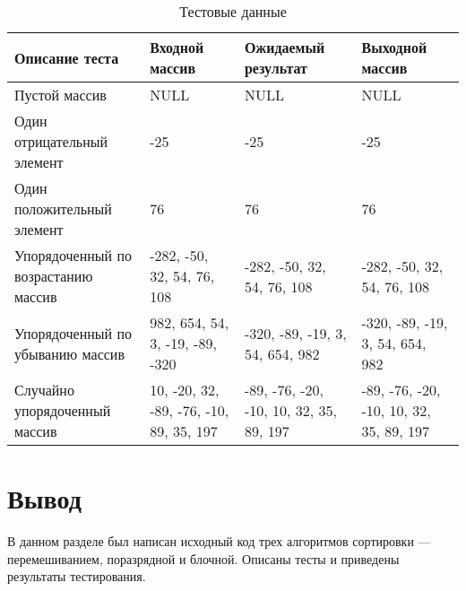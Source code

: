 \begin{table}[H]
\caption{Тестовые данные}
\label{tabular:testsdata}
\begin{tabular}{|p{3.5cm}|p{4cm}|p{4cm}|p{4cm}|}
\hline
\textbf{Описание теста} & \textbf{Входной массив} & \textbf{Ожидаемый результат} & \textbf{Выходной массив} \tabularnewline
\hline
Пустой массив & NULL & NULL & NULL \tabularnewline
\hline
Один отрицательный элемент & -25 & -25 & -25 \tabularnewline
\hline
Один положительный элемент & 76 & 76 & 76 \tabularnewline
\hline
Упорядоченный по возрастанию массив & -282, -50, 32, 54, 76, 108 & -282, -50, 32, 54, 76, 108 & -282, -50, 32, 54, 76, 108 \tabularnewline
\hline
Упорядоченный по убыванию массив & 982, 654, 54, 3, -19, -89, -320 & -320, -89, -19, 3, 54, 654, 982 & -320, -89, -19, 3, 54, 654, 982 \tabularnewline
\hline
Случайно упорядоченный массив & 10, -20, 32, -89, -76, -10, 89, 35, 197 & -89, -76, -20, -10, 10, 32, 35, 89, 197 & -89, -76, -20, -10, 10, 32, 35, 89, 197 \tabularnewline
\hline
\end{tabular}
\end{table}

\section*{Вывод}

В данном разделе был написан исходный код трех алгоритмов сортировки --- перемешиванием, поразрядной и блочной. Описаны тесты и приведены результаты тестирования.
